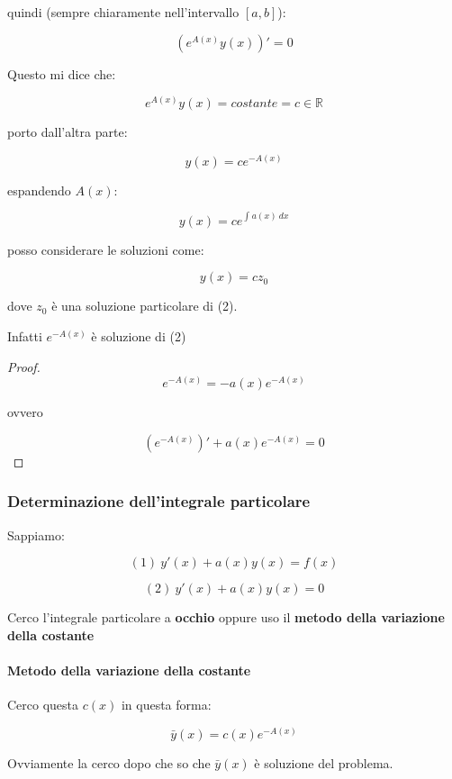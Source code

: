 \documentclass[11pt]{article}
\begin{document}
quindi (sempre chiaramente nell'intervallo $[a,b]$):

\[
    (e ^{A(x)}y(x))'=0
\]

Questo mi dice che:

\[
    e ^{A(x)}y(x) = costante=c \in \mathbb{R}
\]

porto dall'altra parte:

\[
    y(x) = c e ^{-A(x)}
\]

espandendo $A(x)$:

\[
    y(x) = c e ^{\int_{{}}^{{}} {a(x)} \: d{x} {}}
\]

posso considerare le soluzioni come:

\[
    y(x) = c z_0
\]

dove $z_0$ è una soluzione particolare di (2).

Infatti $e ^{-A(x)}$ è soluzione di (2)

\begin{proof}
    \[
    e ^{-A(x)} = -a(x) e ^{-A(x)}
\]

ovvero

\[
    (e ^{-A(x)})'+a(x) e ^{-A(x)}=0
\]
    
\end{proof}


\subsubsection{Determinazione dell'integrale particolare}

Sappiamo:

\[
    (1)\ y'(x)+a(x)y(x)=f(x)
\]

\[
    (2)\ y'(x)+a(x)y(x)=0
\]

Cerco l'integrale particolare a \textbf{occhio} oppure uso il \textbf{metodo della variazione della costante}

\paragraph{Metodo della variazione della costante}

Cerco questa $c(x)$ in questa forma:

\[
    \bar y(x) = c(x) e ^{-A(x)}
\]

Ovviamente la cerco dopo che so che $\bar y(x)$ è soluzione del problema.
\end{document}
